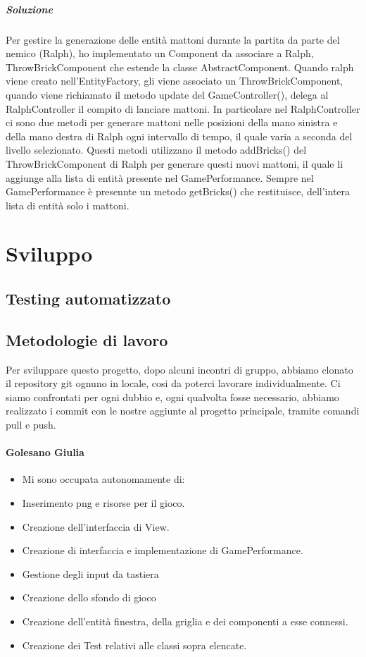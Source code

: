 \documentclass[a4paper,12pt]{report}
\begin{document}
\paragraph{Soluzione} Per gestire la generazione delle entità mattoni durante la partita da parte del nemico (Ralph), ho implementato un Component da associare a Ralph, ThrowBrickComponent che estende la classe AbstractComponent. Quando ralph viene creato nell'EntityFactory, gli viene associato un ThrowBrickComponent, quando viene richiamato il metodo update del GameController(), delega al RalphController il compito di lanciare mattoni. In particolare nel RalphController ci sono due metodi per generare mattoni nelle posizioni della mano sinistra e della mano destra di Ralph ogni intervallo di tempo, il quale varia a seconda del livello selezionato. 
Questi metodi utilizzano il metodo addBricks() del ThrowBrickComponent di Ralph per generare questi nuovi mattoni, il quale li aggiunge alla lista di entità presente nel GamePerformance. Sempre nel GamePerformance è presennte un metodo getBricks() che restituisce, dell'intera lista di entità solo i mattoni. 

\chapter{Sviluppo}
\section{Testing automatizzato}

\section{Metodologie di lavoro}
Per sviluppare questo progetto, dopo alcuni incontri di gruppo, abbiamo clonato il repository git ognuno in locale, cosi da poterci lavorare individualmente.
Ci siamo confrontati per ogni dubbio e, ogni qualvolta fosse necessario, abbiamo realizzato i commit con le nostre aggiunte al progetto principale, tramite comandi pull e push.

\subsubsection{Golesano Giulia}
\begin{itemize}
    \item Mi sono occupata autonomamente di:
    \item Inserimento png e risorse per il gioco.
    \item Creazione dell'interfaccia di View.
    \item Creazione di interfaccia e implementazione di GamePerformance.
    \item Gestione degli input da tastiera
    \item Creazione dello sfondo di gioco
    \item Creazione dell'entità finestra, della griglia e dei componenti a esse connessi.
    \item Creazione dei Test relativi alle classi sopra elencate.
\end{itemize}
\end{document}
